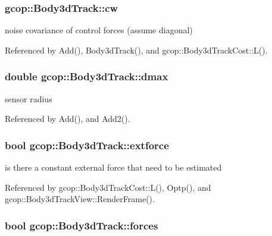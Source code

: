 \subsubsection[{cw}]{ {\bf gcop\-::\-Body3d\-Track\-::cw}}\label{classgcop_1_1Body3dTrack_a13af4fb88ecf91b51a07d22a15c4b119}


noise covariance of control forces (assume diagonal) 



\-Referenced by \-Add(), \-Body3d\-Track(), and gcop\-::\-Body3d\-Track\-Cost\-::\-L().

\subsubsection[{dmax}]{\setlength{\rightskip}{0pt plus 5cm}double {\bf gcop\-::\-Body3d\-Track\-::dmax}}\label{classgcop_1_1Body3dTrack_a864e32c795f1210b449d46382c0a1122}


sensor radius 



\-Referenced by \-Add(), and \-Add2().

\subsubsection[{extforce}]{\setlength{\rightskip}{0pt plus 5cm}bool {\bf gcop\-::\-Body3d\-Track\-::extforce}}\label{classgcop_1_1Body3dTrack_a2e2b1d2507620c3ca5e4b1f1facbce90}


is there a constant external force that need to be estimated 



\-Referenced by gcop\-::\-Body3d\-Track\-Cost\-::\-L(), \-Optp(), and gcop\-::\-Body3d\-Track\-View\-::\-Render\-Frame().

\subsubsection[{forces}]{\setlength{\rightskip}{0pt plus 5cm}bool {\bf gcop\-::\-Body3d\-Track\-::forces}}\label{classgcop_1_1Body3dTrack_af0871f295858e1ec4de8020c7f87d2a5}


